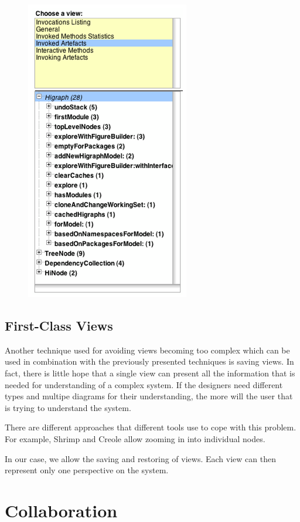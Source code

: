 \documentclass[preprint,12pt]{elsarticle}
\begin{document}
\begin{figure}[h]
\begin{center}
\includegraphics[width=0.4\linewidth]{images/DetailForEdge.png}
\caption{}
\label{}
\end{center}
\end{figure}




\subsection {First-Class Views}

Another technique used for avoiding views becoming too complex which can be used in combination with the previously presented techniques is saving views. In fact, there is little hope that a single view can present all the information that is needed for understanding of a complex system. If the designers need different types and multipe diagrams for their understanding, the more will the user that is trying to understand the system. 

There are different approaches that different tools use to cope with this problem. For example, Shrimp and Creole allow zooming in into individual nodes. 

In our case, we allow the saving and restoring of views. Each view can then represent only one perspective on the system. 



\section {Collaboration}
\label {sec:collab}
\end{document}
